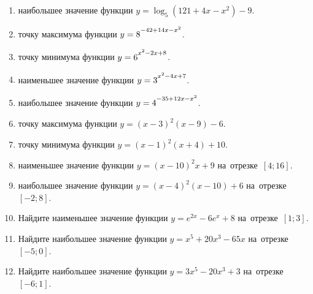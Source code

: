 \documentclass[a4paper,10pt]{article}
\begin{document}
\begin{enumerate}
\item {} наибольшее значение функции $y=\log_5\left(121+4x-x^2\right)-9$.

\item {} точку максимума функции $y=8\strut^{-42+14x-x^2}$.

\item {} точку минимума функции $y=6\strut^{x^2-2x+8}$.

\item {} наименьшее значение функции $y=3\strut^{x^2-4x+7}$.

\item {} наибольшее значение функции $y=4\strut^{-35+12x-x^2}$.

\item {} точку максимума функции $y=\left(x-3\right)^2\left(x-9\right)-6$.

\item {} точку минимума функции $y=\left(x-1\right)^2\left(x+4\right)+10$.

\item {} наименьшее значение функции $y=\left(x-10\right)^2x+9$ на~отрезке~$\left[4;16\right]$.

\item {} наибольшее значение функции $y=\left(x-4\right)^2\left(x-10\right)+6$ на~отрезке~$\left[-2;8\right]$.

\item Найдите наименьшее значение функции $y=e^{2x}-6e^x+8$ на~отрезке~$\left[1;3\right]$.

\item Найдите наибольшее значение функции $y=x^5+20x^3-65x$ на~отрезке~$\left[-5;0\right]$.

\item Найдите наибольшее значение функции $y=3x^5-20x^3+3$ на~отрезке~$\left[-6;1\right]$.

\end{enumerate}
\end{document}
